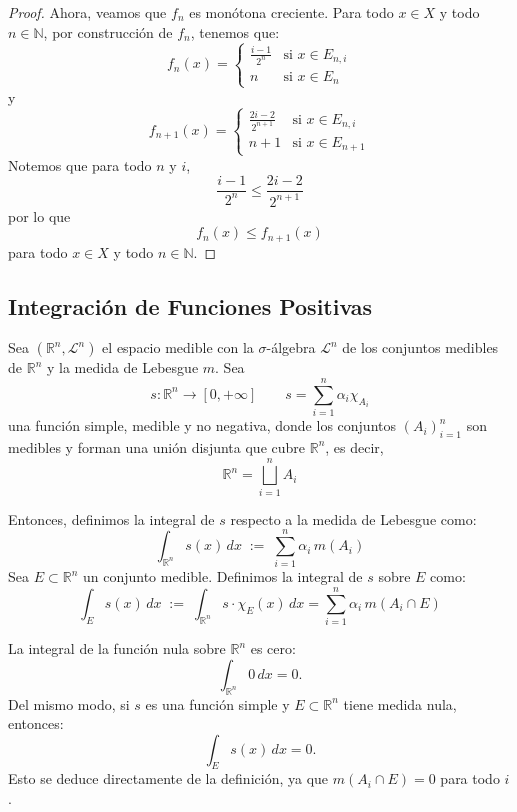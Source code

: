 \begin{proof}
    Ahora, veamos que \(f_n\) es monótona creciente. Para todo \(x \in X\) y todo
    \(n \in \mathbb{N}\), por construcción de \(f_n\), tenemos que:
    \[
        f_n(x) =
        \begin{cases}
            \frac{i-1}{2^n} & \text{si } x \in E_{n,i} \\
            n               & \text{si } x \in E_n
        \end{cases}
    \]
    y
    \[
        f_{n+1}(x) =
        \begin{cases}
            \frac{2i - 2}{2^{n+1}} & \text{si } x \in E_{n,i} \\
            n+1                    & \text{si } x \in E_{n+1}
        \end{cases}
    \]
    Notemos que para todo \(n\) y \(i\),
    \[
        \frac{i-1}{2^n} \leq \frac{2i - 2}{2^{n+1}}
    \]
    por lo que
    \[
        f_n(x) \leq f_{n+1}(x)
    \]
    para todo \(x \in X\) y todo \(n \in \mathbb{N}\).
\end{proof}

\subsection{Integración de Funciones Positivas}

\begin{definición}
Sea $(\mathbb{R}^n, \mathcal{L}^n)$ el espacio medible con la $\sigma$-álgebra $\mathcal{L}^n$ de los conjuntos medibles de $\mathbb{R}^n$ y la medida de Lebesgue \(m\). Sea
\[
    s: \mathbb{R}^n \to [0, +\infty] \qquad s = \sum_{i=1}^n \alpha_i \chi_{A_i}
\]
una función simple, medible y no negativa, donde los conjuntos
\((A_i)_{i=1}^n\) son medibles y forman una unión disjunta que cubre
\(\mathbb{R}^n\), es decir,
\[
    \mathbb{R}^n = \bigsqcup_{i=1}^n A_i
\]

Entonces, definimos la integral de \(s\) respecto a la medida de Lebesgue como:
\[
    \int_{\mathbb{R}^n} s(x) \, dx \;:=\; \sum_{i=1}^n \alpha_i \, m(A_i)
\]
Sea $E \subset \mathbb{R}^n$ un conjunto medible. Definimos la integral de
\(s\) sobre \(E\) como:
\[
    \int_E s(x) \, dx \;:=\; \int_{\mathbb{R}^n} s \cdot \chi_E(x) \, dx = \sum_{i=1}^n \alpha_i \, m(A_i \cap E)
\]
\end{definición}

\begin{observación}
La integral de la función nula sobre \( \mathbb{R}^n \) es cero:
\[
    \int_{\mathbb{R}^n} 0 \, dx = 0.
\]
Del mismo modo, si \( s \) es una función simple y \( E \subset \mathbb{R}^n \)
tiene medida nula, entonces:
\[
    \int_E s(x) \, dx = 0.
\]
Esto se deduce directamente de la definición, ya que \( m(A_i \cap E) = 0 \)
para todo \( i \).
\end{observación}

